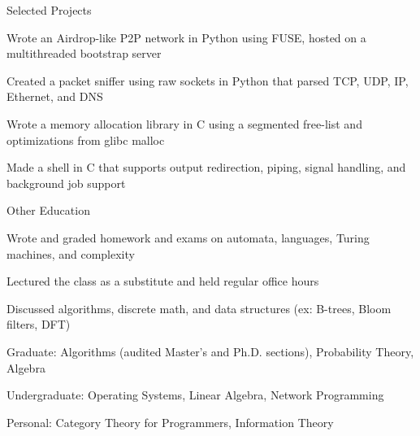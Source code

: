 \documentclass{cv}
\begin{document}
\begin{cvsection}{Selected Projects}
  {
    \item Wrote an Airdrop-like P2P network in Python using FUSE, hosted on a multithreaded bootstrap server
  }
  {
    \item Created a packet sniffer using raw sockets in Python that parsed TCP, UDP, IP, Ethernet, and DNS
  }
  {
    \item Wrote a memory allocation library in C using a segmented free-list and optimizations from glibc malloc
  }
  {
    \item Made a shell in C that supports output redirection, piping, signal handling, and background job support
  }
\end{cvsection}

\begin{cvsection}{Other Education}
  {
    \item Wrote and graded homework and exams on automata, languages, Turing machines, and complexity
    \item Lectured the class as a substitute and held regular office hours
  }
  {
    \item Discussed algorithms, discrete math, and data structures (ex: B-trees, Bloom filters, DFT)
  }
  {
  \item Graduate: Algorithms (audited Master's and Ph.D. sections), Probability Theory, Algebra
  \item Undergraduate: Operating Systems, Linear Algebra, Network Programming
  \item Personal: Category Theory for Programmers, Information Theory
  }
\end{cvsection}
\end{document}
